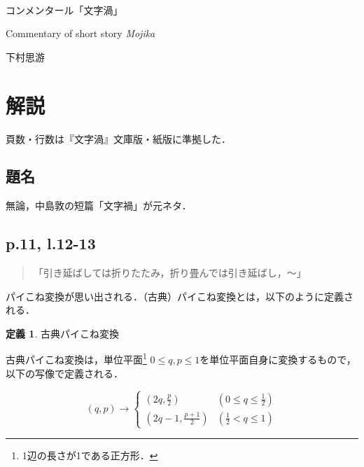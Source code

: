 \documentclass[10pt, a5paper, twoside]{jsarticle}
\theoremstyle{definition}
\newtheorem{dfn}{定義}
\begin{document}
	{\Large 　} %

	\begin{center}

		\Large{コンメンタール「文字渦」}

		\vspace{3mm}

		\large{Commentary of short story \textit{Mojika}}

		\vspace{3mm}
		
		\large{下村思游}

	\end{center}

	\vspace{3mm}

	\section{解説}

		頁数・行数は『文字渦』文庫版・紙版\cite{mojika}に準拠した．

		\subsection{題名}

		無論，中島敦の短篇「文字禍」が元ネタ．

		\subsection{p.11, l.12-13}

		\begin{quote}
			
			「引き延ばしては折りたたみ，折り畳んでは引き延ばし，〜」
		
		\end{quote}
		
		パイこね変換が思い出される．（古典）パイこね変換とは，以下のように定義される\cite{pie}．

		\begin{dfn}

			古典パイこね変換
			
			古典パイこね変換は，単位平面\footnote{1辺の長さが1である正方形．} $0 \leq q, p \leq 1$を単位平面自身に変換するもので，以下の写像で定義される．
			
			\begin{equation*}
				(q, p) \rightarrow \begin{cases} (2q, \frac{p}{2}) & (0 \leq q \leq \frac{1}{2}) \\ (2q-1, \frac{p+1}{2}) & (\frac{1}{2} < q \leq 1) \end{cases}
			\end{equation*}

		\end{dfn}
\end{document}
